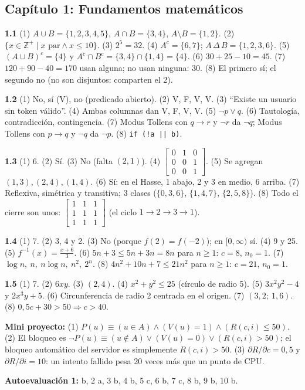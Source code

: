 \subsection*{Cap\'itulo 1: Fundamentos matem\'aticos}
\textbf{1.1}\label{resp:1-1}\quad
(1) $A\cup B=\{1, 2, 3, 4, 5\}$, $A\cap B=\{3, 4\}$, $A\setminus B=\{1, 2\}$. (2) $\{x\in\mathbb Z^+\mid x\text{ par}\wedge x\le10\}$. (3) $2^5=32$. (4) $A^c=\{6, 7\}$; $A\,\Delta\,B=\{1, 2, 3, 6\}$. (5) $(A\cup B)^c=\{4\}$ y $A^c\cap B^c=\{3, 4\}\cap\{1, 4\}=\{4\}$. (6) $30+25-10=45$. (7) $120+90-40=170$ usan alguna; no usan ninguna: $30$. (8) El primero s\'i; el segundo no (no son disjuntos: comparten el 2).

\medskip\noindent\textbf{1.2}\label{resp:1-2}\quad
(1) No, s\'i (V), no (predicado abierto). (2) V, F, V, V. (3) ``Existe un usuario sin token v\'alido''. (4) Ambas columnas dan V, F, V, V. (5) $\neg p\vee q$. (6) Tautolog\'ia, contradicci\'on, contingencia. (7) Modus Tollens con $q\to r$ y $\neg r$ da $\neg q$; Modus Tollens con $p\to q$ y $\neg q$ da $\neg p$. (8) \texttt{if (!a || b)}.

\medskip\noindent\textbf{1.3}\label{resp:1-3}\quad
(1) 6. (2) S\'i. (3) No (falta $(2, 1)$). (4) $\begin{bmatrix}0&1&0\\0&0&1\\0&0&1\end{bmatrix}$. (5) Se agregan $(1, 3),(2, 4),(1, 4)$. (6) S\'i: en el Hasse, 1 abajo, 2 y 3 en medio, 6 arriba. (7) Reflexiva, sim\'etrica y transitiva; 3 clases ($\{0, 3, 6\}$, $\{1, 4, 7\}$, $\{2, 5, 8\}$). (8) Todo el cierre son unos: $\begin{bmatrix}1&1&1\\1&1&1\\1&1&1\end{bmatrix}$ (el ciclo $1\to2\to3\to1$).

\medskip\noindent\textbf{1.4}\label{resp:1-4}\quad
(1) 7. (2) 3, 4 y 2. (3) No (porque $f(2)=f(-2)$); en $[0,\infty)$ s\'i. (4) 9 y 25. (5) $f^{-1}(x)=\frac{x+6}{3}$. (6) $5n+3\le5n+3n=8n$ para $n\ge1$: $c=8$, $n_0=1$. (7) $\log n,\ n,\ n\log n,\ n^2,\ 2^n$. (8) $4n^2+10n+7\le21n^2$ para $n\ge1$: $c=21$, $n_0=1$.

\medskip\noindent\textbf{1.5}\label{resp:1-5}\quad
(1) 7. (2) $6xy$. (3) $(2, 4)$. (4) $x^2+y^2\le25$ (c\'irculo de radio 5). (5) $3x^2y^2-4$ y $2x^3y+5$. (6) Circunferencia de radio 2 centrada en el origen. (7) $(3{,}2;\ 1{,}6)$. (8) $0{,}5c+30>50\Rightarrow c>40$.

\medskip\noindent\textbf{Mini proyecto:} (1) $P(u)\equiv(u\in A)\wedge(V(u)=1)\wedge(R(c, i)\le50)$. (2) El bloqueo es $\neg P(u)\equiv(u\notin A)\vee(V(u)=0)\vee(R(c, i)>50)$; el bloqueo autom\'atico del servidor es simplemente $R(c, i)>50$. (3) $\partial R/\partial c=0{,}5$ y $\partial R/\partial i=10$: un intento fallido pesa 20 veces m\'as que un punto de CPU.

\medskip\noindent\textbf{Autoevaluaci\'on 1:}\label{resp:q1} b, 2 a, 3 b, 4 b, 5 c, 6 b, 7 c, 8 b, 9 b, 10 b.
